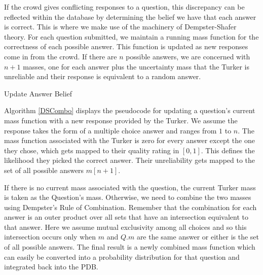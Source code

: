 If the crowd gives conflicting  responses to a question, this discrepancy can be reflected within the database by determining the belief we have that each answer is correct.  This is where we make use of the machinery of Dempster-Shafer theory.  For each question submitted, we maintain a running mass function for the correctness of each possible answer.  This function is updated as new responses come in from the crowd.  If there are $n$ possible answers, we are concerned with $n+1$ masses, one for each answer plus the uncertainty mass that the Turker is unreliable and their response is equivalent to a random answer.  


\begin{algorithm}
	\SetAlgoLined
	\caption{Update Answer Belief}
	\label{DSCombo}
\end{algorithm}

Algorithm \ref{DSCombo} displays the pseudocode for updating a question's current mass function with a new response provided by the Turker. We assume the response takes the form of a multiple choice answer and ranges from $1$ to $n$.  The mass function associated with the Turker is zero for every answer except the one they chose, which gets mapped to their quality rating in $[0,1]$.  This defines the likelihood they picked the correct answer.  Their unreliability gets mapped to the set of all possible answers $m[n+1]$.

If there is no current mass associated with the question, the current Turker mass is taken as the Question's mass.  Otherwise, we need to combine the two masses using Dempster's Rule of Combination.  Remember that the combination for each answer is an outer product over all sets that have an intersection equivalent to that answer.  Here we assume mutual exclusivity among all choices and so this intersection occurs only when $m$ and $Q.m$ are the same answer or either is the set of all possible answers.  The final result is a newly combined mass function which can easily be converted into a probability distribution for that question and integrated back into the PDB.

